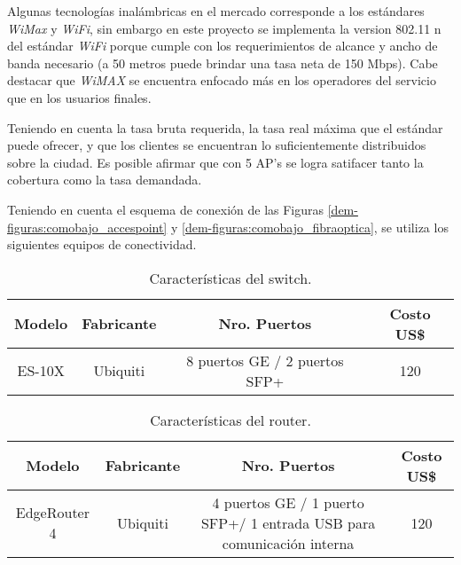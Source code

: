 Algunas tecnologías inalámbricas en el mercado corresponde a los estándares \textit{WiMax} y \textit{WiFi}, sin embargo en este proyecto se implementa la version 802.11 n del estándar \textit{WiFi} porque cumple con los requerimientos de alcance y ancho de banda necesario (a 50 metros puede brindar una tasa neta de 150 Mbps). Cabe destacar que \textit{WiMAX} se encuentra enfocado más en los operadores del servicio que en los usuarios finales\cite{wifivswimax}.

Teniendo en cuenta la tasa bruta requerida, la tasa real máxima que el estándar puede ofrecer, y que los clientes se encuentran lo suficientemente distribuidos sobre la ciudad. Es posible afirmar que con 5 AP's se logra satifacer tanto la cobertura como la tasa demandada.





Teniendo en cuenta el esquema de conexión de las Figuras \ref{dem-figuras:comobajo_accespoint} y \ref{dem-figuras:comobajo_fibraoptica}, se utiliza los siguientes equipos de conectividad.



\begin{table}[H]
  \tiny
  \centering
    \begin{tabular}{|c|c|c|c|}
    \hline
    \rowcolor[rgb]{ .773,  .851,  .945} \textbf{Modelo} & \textbf{Fabricante} & \textbf{Nro. Puertos} & \textbf{Costo US\$} \bigstrut\\
    \hline
    ES-10X &   Ubiquiti    & 8 puertos GE / 2 puertos SFP+ & 120\cite{switch} \bigstrut\\
    \hline
    \end{tabular}%
	\caption{Características del switch.}
  \label{tab:caracteristicas-switch}%
\end{table}%



\begin{table}[H]
  \tiny
  \centering
  
    \begin{tabular}{|c|c|c|c|}
    \hline
    \rowcolor[rgb]{ .773,  .851,  .945} \textbf{Modelo} & \textbf{Fabricante} & \textbf{Nro. Puertos} & \textbf{Costo US\$} \bigstrut\\
    \hline
    EdgeRouter 4 & Ubiquiti & 4 puertos GE / 1 puerto SFP+/ 1 entrada USB para comunicación interna & 120\cite{estefi3} \bigstrut\\
    \hline
    \end{tabular}%
	\caption{Características del router.}
  \label{tab:caracteristicas-router}%
\end{table}%


